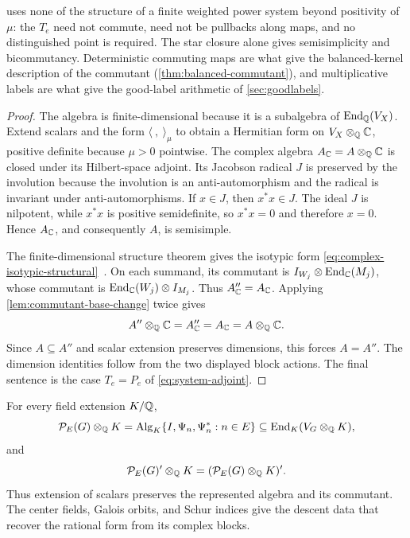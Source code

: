  uses none of the structure of a
finite weighted power system beyond positivity of \(\mu\): the \(T_e\) need
not commute, need not be pullbacks along maps, and no distinguished point is
required.  The star closure alone gives semisimplicity and
bicommutancy.  Deterministic commuting maps are what give the balanced-kernel
description of the commutant (\cref{thm:balanced-commutant}), and
multiplicative labels are what give the good-label arithmetic of
\cref{sec:goodlabels}.

\begin{proof}
The algebra is finite-dimensional because it is a subalgebra of
\(\operatorname{End}_\mathbb Q(V_X)\).  Extend scalars and the form \(\langle\ ,\ \rangle_\mu\) to
obtain a Hermitian form on \(V_X\otimes_\mathbb Q\mathbb C\), positive definite because
\(\mu>0\) pointwise.  The complex
algebra \(A_\mathbb C=A\otimes_\mathbb Q\mathbb C\) is closed under its Hilbert-space adjoint.
Its Jacobson radical \(J\) is preserved by the involution because the
involution is an anti-automorphism and the radical is invariant under
anti-automorphisms.  If \(x\in J\), then \(x^*x\in J\).  The ideal \(J\)
is nilpotent, while \(x^*x\) is positive semidefinite, so \(x^*x=0\) and
therefore \(x=0\).  Hence \(A_\mathbb C\), and consequently \(A\), is
semisimple.

The finite-dimensional structure theorem gives the
isotypic form \eqref{eq:complex-isotypic-structural}~\cite{Wedderburn}.
On each summand,
its commutant is
\(I_{W_j}\otimes\operatorname{End}_\mathbb C(M_j)\), whose commutant is
\(\operatorname{End}_\mathbb C(W_j)\otimes I_{M_j}\).  Thus \(A_\mathbb C''=A_\mathbb C\).  Applying
\cref{lem:commutant-base-change} twice gives
\[
 A''\otimes_\mathbb Q\mathbb C=A_\mathbb C''=A_\mathbb C=A\otimes_\mathbb Q\mathbb C.
\]
Since \(A\subseteq A''\) and scalar extension preserves dimensions, this
forces \(A=A''\).  The dimension identities follow from the two displayed
block actions.  The final sentence is the case \(T_e=P_e\) of
\eqref{eq:system-adjoint}.
\end{proof}

\begin{proposition}
\label{prop:field-extension}
For every field extension \(K/\mathbb Q\),
\[
 \mathcal P_E(G)\otimes_\mathbb Q K
 =\operatorname{Alg}_K\{I,\Psi_n,\Psi_n^*:n\in E\}
 \subseteq\operatorname{End}_K(V_G\otimes_\mathbb Q K),
\]
and
\[
 \mathcal P_E(G)'\otimes_\mathbb Q K
 =(\mathcal P_E(G)\otimes_\mathbb Q K)'.
\]
Thus extension of scalars preserves the represented algebra and its
commutant.  The center fields, Galois orbits, and Schur indices give the
descent data that recover the rational form from its complex blocks.
\end{proposition}

